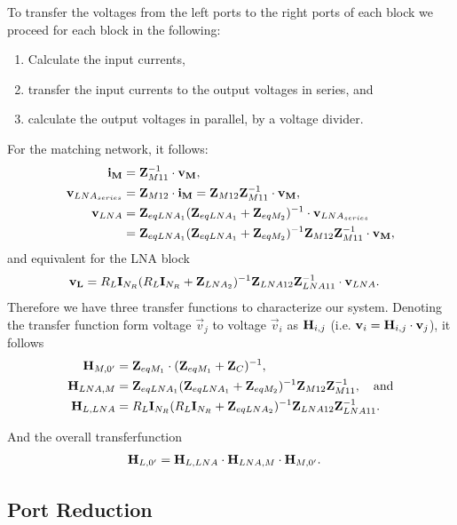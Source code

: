 To transfer the voltages from the left ports to the right ports of each block we proceed for each block in the following: 
\begin{enumerate}
\item{Calculate the input currents,}
\item{transfer the input currents to the output voltages in series, and}
\item{calculate the output voltages in parallel, by a voltage divider.}
\end{enumerate}
For the matching network, it follows:
\begin{align}
\mathbf{i_M} &= \mathbf{Z}_{M11}^{-1}\cdot\mathbf{v_M},\\
\mathbf{v}_{LNA_{series}} &= \mathbf{Z}_{M12}\cdot\mathbf{i_M} = \mathbf{Z}_{M12} \mathbf{Z}_{M11}^{-1}\cdot\mathbf{v_M},\\
\mathbf{v}_{LNA} &= \mathbf{Z}_{eqLNA_1}(\mathbf{Z}_{eqLNA_1}+\mathbf{Z}_{eqM_2})^{-1}\cdot\mathbf{v}_{LNA_{series}}\\\nonumber
&=\mathbf{Z}_{eqLNA_1}(\mathbf{Z}_{eqLNA_1}+\mathbf{Z}_{eqM_2})^{-1}\mathbf{Z}_{M12} \mathbf{Z}_{M11}^{-1}\cdot\mathbf{v_M},
\end{align}
and equivalent for the LNA block
\begin{align}
\mathbf{v_{L}}&=R_L\mathbf{I}_{N_R}(R_L\mathbf{I}_{N_R}+\mathbf{Z}_{LNA_2})^{-1}\mathbf{Z}_{LNA12}\mathbf{Z}_{LNA11}^{-1}\cdot\mathbf{v}_{LNA}.
\end{align}
Therefore we have three transfer functions to characterize our system.
Denoting the transfer function form voltage $\vec{v}_j$ to voltage $\vec{v}_i$ as $\mathbf{H}_{i,j}$ (i.e. $\mathbf{v}_i = \mathbf{H}_{i,j} \cdot\mathbf{v}_j$), it follows
\begin{align}
\mathbf{H}_{M,0'} &= \mathbf{Z}_{eqM_1}\cdot(\mathbf{Z}_{eqM_1} + \mathbf{Z}_{C})^{-1}, \\
\mathbf{H}_{LNA,M} &= \mathbf{Z}_{eqLNA_1}(\mathbf{Z}_{eqLNA_1}+\mathbf{Z}_{eqM_2})^{-1}\mathbf{Z}_{M12} \mathbf{Z}_{M11}^{-1},\quad\text{and}\\
\mathbf{H}_{L,LNA} &= R_L\mathbf{I}_{N_R}(R_L\mathbf{I}_{N_R}+\mathbf{Z}_{eqLNA_2})^{-1}\mathbf{Z}_{LNA12}\mathbf{Z}_{LNA11}^{-1}.
\end{align}

And the overall transferfunction
\begin{align}
\mathbf{H}_{L,0'} &= \mathbf{H}_{L,LNA}\cdot\mathbf{H}_{LNA,M}\cdot\mathbf{H}_{M,0'}.
\end{align}



\subsection{Port Reduction}
\label{sec:port_reduction}

